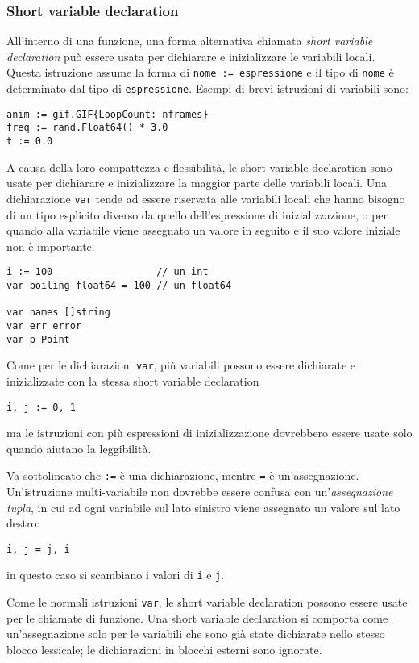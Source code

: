 \documentclass[../../../thesis.tex]{subfiles}
\begin{document}
    \subsubsection{Short variable declaration}
    All'interno di una funzione, una forma alternativa chiamata \textit{short variable declaration} può essere usata per dichiarare e inizializzare le variabili locali.
    Questa istruzione assume la forma di \verb"nome := espressione" e il tipo di \verb"nome" è determinato dal tipo di \verb"espressione".
    Esempi di brevi istruzioni di variabili sono:
    \begin{lstlisting}[frame = single, label = {lst:lstlisting1-3-1.1}]
anim := gif.GIF{LoopCount: nframes}
freq := rand.Float64() * 3.0
t := 0.0
    \end{lstlisting}
    A causa della loro compattezza e flessibilità, le short variable declaration sono usate per dichiarare e inizializzare la maggior parte delle variabili locali.
    Una dichiarazione \verb"var" tende ad essere riservata alle variabili locali che hanno bisogno di un tipo esplicito diverso da quello dell'espressione di inizializzazione, o per quando alla variabile viene assegnato un valore in seguito e il suo valore iniziale non è importante.
    \begin{lstlisting}[frame = single, label = {lst:lstlisting1-3-1.2}]
i := 100                  // un int
var boiling float64 = 100 // un float64

var names []string
var err error
var p Point
    \end{lstlisting}
    Come per le dichiarazioni \verb"var", più variabili possono essere dichiarate e inizializzate con la stessa short variable declaration
    \begin{lstlisting}[frame = single, label = {lst:lstlisting1-3-1.3}]
i, j := 0, 1
    \end{lstlisting}
    ma le istruzioni con più espressioni di inizializzazione dovrebbero essere usate solo quando aiutano la leggibilità.
    \hfill \vspace{12pt}

    Va sottolineato che \verb":=" è una dichiarazione, mentre \verb"=" è un'assegnazione.
    Un'istruzione multi-variabile non dovrebbe essere confusa con un'\textit{assegnazione tupla}, in cui ad ogni variabile sul lato sinistro viene assegnato un valore sul lato destro:
    \begin{lstlisting}[frame = single, label = {lst:lstlisting1-3-1.4}]
i, j = j, i
    \end{lstlisting}
    in questo caso si scambiano i valori di \verb"i" e \verb"j".
    \hfill \vspace{12pt}

    Come le normali istruzioni \verb"var", le short variable declaration possono essere usate per le chiamate di funzione.
    Una short variable declaration si comporta come un'assegnazione solo per le variabili che sono già state dichiarate nello stesso blocco lessicale;
    le dichiarazioni in blocchi esterni sono ignorate.
\end{document}
